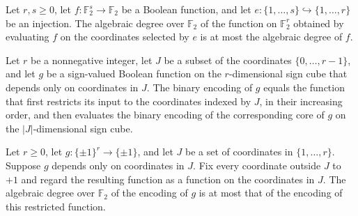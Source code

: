 \begin{theorem}
\label{FABL.functionAlgebraicDegree_coordinatePullback_le}
\leanok
{}
Let $r,s\ge 0$, let $f:\mathbb{F}_2^s\to\mathbb{F}_2$ be a Boolean function, and let
$e:\{1,\ldots,s\}\hookrightarrow\{1,\ldots,r\}$ be an injection. The algebraic degree
over $\mathbb{F}_2$ of the function on $\mathbb{F}_2^r$ obtained by evaluating $f$ on
the coordinates selected by $e$ is at most the algebraic degree of $f$.
\end{theorem}

\begin{theorem}
\leanok
{}
Let $r$ be a nonnegative integer, let $J$ be a subset of the coordinates
$\{0,\ldots,r-1\}$, and let $g$ be a sign-valued Boolean function on the $r$-dimensional
sign cube that depends only on coordinates in $J$. The binary encoding of $g$ equals the
function that first restricts its input to the coordinates indexed by $J$, in their
increasing order, and then evaluates the binary encoding of the corresponding core of
$g$ on the $|J|$-dimensional sign cube.
\end{theorem}

\begin{theorem}
\label{FABL.functionAlgebraicDegree_encoding_le_juntaWitnessCore}
\leanok
{}
Let $r\ge 0$, let $g:\{\pm1\}^r\to\{\pm1\}$, and let $J$ be a set of coordinates in
$\{1,\ldots,r\}$. Suppose $g$ depends only on coordinates in $J$. Fix every coordinate
outside $J$ to $+1$ and regard the resulting function as a function on the coordinates
in $J$. The algebraic degree over $\mathbb{F}_2$ of the encoding of $g$ is at most that
of the encoding of this restricted function.
\end{theorem}

